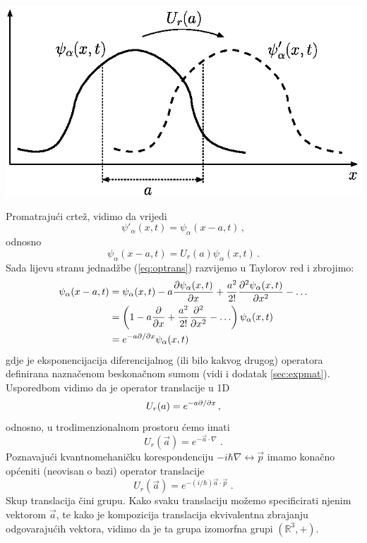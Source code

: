 \centerline{\includegraphics{pics/qmtranslacija.eps}}
Promatrajući crtež, vidimo da vrijedi
\begin{equation}
 \psi'_{\alpha}(x,t)=\psi_{\alpha}(x-a,t) \,,
\end{equation}
odnosno
\begin{equation}
 \psi_{\alpha}(x-a,t)=U_{r}(a)\psi_{\alpha}(x,t)   \,.
 \label{eq:optrans}
\end{equation}
Sada lijevu stranu jednadžbe (\ref{eq:optrans}) razvijemo u Taylorov red
i zbrojimo:
\begin{equation*}
\begin{split}
 \psi_{\alpha}(x-a,t)&=\psi_{\alpha}(x,t)-a\frac{\partial\psi_{\alpha}(x,t)}
{\partial x}+\frac{a^2}{2!}\frac{\partial^2 \psi_{\alpha}(x,t)}{\partial x^2}-\ldots \\
&=\left(1-a\frac{\partial}{\partial x}+\frac{a^2}{2!}\frac{\partial^2}{\partial x^2} - \ldots\right)
\psi_{\alpha}(x,t) \\
&=e^{-a \partial / \partial  x} \psi_{\alpha}(x,t)
\end{split}
\end{equation*}
gdje je eksponencijacija diferencijalnog (ili bilo kakvog drugog) operatora
definirana naznačenom beskonačnom sumom (vidi i dodatak \ref{sec:expmat}).
Usporedbom vidimo da je operator translacije u 1D
\begin{equation}
U_r(a)= e^{-a \partial / \partial  x} \,,
\end{equation}
odnosno, u trodimenzionalnom prostoru ćemo imati
\begin{equation}
U_r(\vec{a})= e^{-\vec{a}\cdot\nabla} \;.
\end{equation}
Poznavajući kvantnomehaničku korespondenciju $-i\hbar\nabla \leftrightarrow
\vec{p}$ imamo konačno općeniti (neovisan o bazi) operator translacije
\begin{equation}
U_r(\vec{a})= e^{-(i/\hbar)\vec{a}\cdot\vec{p}} \;.
\label{eq:Ur}
\end{equation}
Skup translacija čini grupu. Kako svaku translaciju možemo specificirati njenim 
vektorom $\vec{a}$, te kako je kompozicija translacija ekvivalentna zbrajanju
odgovarajućih vektora, vidimo da je ta grupa izomorfna grupi $(\mathbb{R}^3, +)$.


